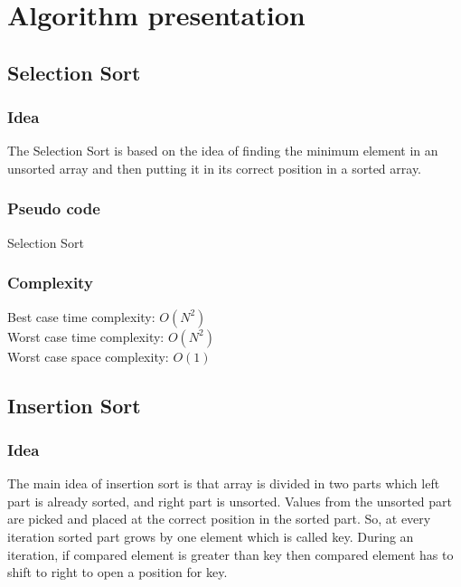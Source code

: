 \documentclass[11pt,a4paper]{article}
\begin{document}
\section{Algorithm presentation}
\subsection{Selection Sort}

\subsubsection*{Idea}
The Selection Sort is based on the idea of finding the minimum element in an unsorted array and then putting it in its correct position in a sorted array.

\subsubsection*{Pseudo code}
\begin{algorithm2e}
  \SetAlgoLined
  \caption{Selection Sort}
\end{algorithm2e}

\subsubsection*{Complexity}
Best case time complexity: $O(N^2)$ \\
Worst case time complexity: $O(N^2)$ \\
Worst case space complexity: $O(1)$

\subsection{Insertion Sort}
\subsubsection*{Idea}
The main idea of insertion sort is that array is divided in two parts which left part is already sorted, and right part is unsorted.
Values from the unsorted part are picked and placed at the correct position in the sorted part.
So, at every iteration sorted part grows by one element which is called key.
During an iteration, if compared element is greater than key then compared element has to shift to right to open a position for key.
\end{document}

